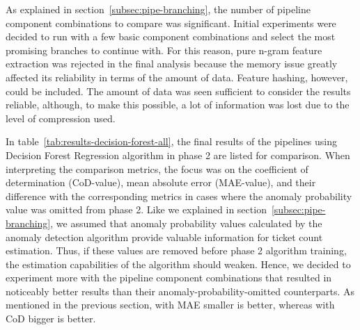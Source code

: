 As explained in section~\ref{subsec:pipe-branching},
the number of pipeline component combinations to compare was significant.
Initial experiments were decided to run with a few basic component combinations
and select the most promising branches to continue with.
For this reason,
pure n-gram feature extraction was rejected in the final analysis
because the memory issue greatly affected its reliability in terms of the amount of data.
Feature hashing, however,
could be included.
The amount of data was seen sufficient to consider the results reliable,
although, to make this possible,
a lot of information was lost due to the level of compression used.

In table~\ref{tab:results-decision-forest-all},
the final results of the pipelines using Decision Forest Regression algorithm in phase 2
are listed for comparison.
When interpreting the comparison metrics,
the focus was on the coefficient of determination (CoD-value),
mean absolute error (MAE-value),
and their difference with the corresponding metrics
in cases where the anomaly probability value was omitted from phase 2.
Like we explained in section~\ref{subsec:pipe-branching},
we assumed that anomaly probability values calculated by the anomaly detection algorithm
provide valuable information for ticket count estimation.
Thus,
if these values are removed before phase 2 algorithm training,
the estimation capabilities of the algorithm should weaken.
Hence,
we decided to experiment more with the pipeline component combinations
that resulted in noticeably better results
than their anomaly-probability-omitted counterparts.
As mentioned in the previous section,
with MAE smaller is better,
whereas with CoD bigger is better.

